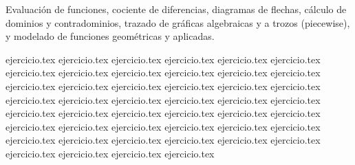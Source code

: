 
Evaluación de funciones, cociente de diferencias, diagramas de flechas, cálculo de dominios y contradominios, trazado de gráficas algebraicas y a trozos (piecewise), y modelado de funciones geométricas y aplicadas.

\begin{enumerate}
    {ejercicio.tex}
    {ejercicio.tex}
    {ejercicio.tex}
    {ejercicio.tex}
    \setcounter{enumi}{4}
    {ejercicio.tex}
    {ejercicio.tex}
    \setcounter{enumi}{6}
    {ejercicio.tex}
    {ejercicio.tex}
    \setcounter{enumi}{8}
    {ejercicio.tex}
    \setcounter{enumi}{9}
    {ejercicio.tex}
    {ejercicio.tex}
    {ejercicio.tex}
    {ejercicio.tex}
    {ejercicio.tex}
    {ejercicio.tex}
    {ejercicio.tex}
    {ejercicio.tex}
    {ejercicio.tex}
    \setcounter{enumi}{18}
    {ejercicio.tex}
    {ejercicio.tex}
    {ejercicio.tex}
    {ejercicio.tex}
    {ejercicio.tex}
    {ejercicio.tex}
    {ejercicio.tex}
    {ejercicio.tex}
    \setcounter{enumi}{26}
    {ejercicio.tex}
    {ejercicio.tex}
    {ejercicio.tex}
    {ejercicio.tex}
    {ejercicio.tex}
    {ejercicio.tex}
    {ejercicio.tex}
    {ejercicio.tex}
    {ejercicio.tex}
    {ejercicio.tex}
    {ejercicio.tex}
    {ejercicio.tex}
    {ejercicio.tex}
    {ejercicio.tex}
    {ejercicio.tex}
    {ejercicio.tex}
    {ejercicio.tex}
    {ejercicio.tex}
    {ejercicio.tex}
    {ejercicio.tex}

\end{enumerate}
